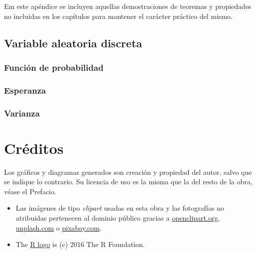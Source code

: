 \documentclass[
]{book}
\begin{document}
Em este apéndice se incluyen aquellas demostraciones de teoremas y propiedades
no incluidas en los capítulos para mantener el carácter práctico del mismo.

\hypertarget{variable-aleatoria-discreta}{%
\section{Variable aleatoria discreta}\label{variable-aleatoria-discreta}}

\hypertarget{funciuxf3n-de-probabilidad}{%
\subsection{Función de probabilidad}\label{funciuxf3n-de-probabilidad}}

\hypertarget{esperanza}{%
\subsection{Esperanza}\label{esperanza}}

\hypertarget{varianza}{%
\subsection{Varianza}\label{varianza}}

\hypertarget{creditos}{%
\chapter{Créditos}\label{creditos}}

Los gráficos y diagramas generados son creación y propiedad del autor, salvo que se
indique lo contrario. Su licencia de uso es la misma que la del resto de la
obra, véase el Prefacio.

\begin{itemize}
\item
  Las imágenes de tipo \emph{clipart} usadas en esta obra y las fotografías no atribuidas
  pertenecen al dominio público gracias a \href{http://www.openclipart.org}{openclipart.org}, \href{https://unsplash.com}{unplash.com} o \href{https://pixabay.com/es/}{pixabay.com}.
\item
  The \href{https://www.r-project.org/logo/}{R logo} is (c) 2016 The R Foundation.
\end{itemize}

\renewcommand\bibname{Referencias}
  
\end{document}

